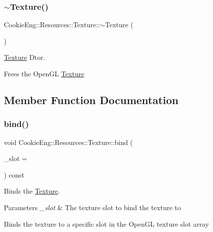 \subsubsection{\texorpdfstring{$\sim$\+Texture()}{~Texture()}}
{\footnotesize\ttfamily Cookie\+Eng\+::\+Resources\+::\+Texture\+::$\sim$\+Texture (\begin{DoxyParamCaption}{ }\end{DoxyParamCaption})}



\hyperlink{class_cookie_eng_1_1_resources_1_1_texture}{Texture} Dtor. 

Frees the Open\+GL \hyperlink{class_cookie_eng_1_1_resources_1_1_texture}{Texture} 

\subsection{Member Function Documentation}
\mbox{\label{class_cookie_eng_1_1_resources_1_1_texture_a19f26d4ff9f73e05562e00532466f4df}} 
\subsubsection{\texorpdfstring{bind()}{bind()}}
{\footnotesize\ttfamily void Cookie\+Eng\+::\+Resources\+::\+Texture\+::bind (\begin{DoxyParamCaption}\item[{G\+Luint}]{\+\_\+slot = {} }\end{DoxyParamCaption}) const}



Binds the \hyperlink{class_cookie_eng_1_1_resources_1_1_texture}{Texture}. 


\begin{DoxyParams}{Parameters}
{\em \+\_\+slot} & The texture slot to bind the texture to\\
\hline
\end{DoxyParams}
Binds the texture to a specific slot in the Open\+GL texture slot array \mbox{\label{class_cookie_eng_1_1_resources_1_1_texture_ac030b164a876de42ad141e9aab422a1c}} 
